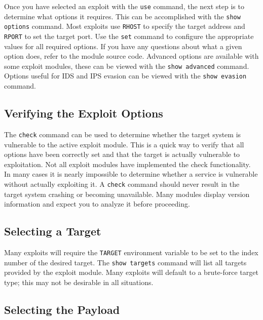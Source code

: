 \documentclass{report}
\begin{document}
\par 
Once you have selected an exploit with the \texttt{use} command, the next step
is to determine what options it requires. This can be accomplished with the
\texttt{show options} command. Most exploits use \texttt{RHOST} to specify the
target address and \texttt{RPORT} to set the target port. Use the \texttt{set}
command to configure the appropriate values for all required options. If you
have any questions about what a given option does, refer to the module source
code.  Advanced options are available with some exploit modules, these can be
viewed with the \texttt{show advanced} command. Options useful for IDS and IPS
evasion can be viewed with the \texttt{show evasion} command.

		\subsection{Verifying the Exploit Options}

\par	
The \texttt{check} command can be used to determine whether the target
system is vulnerable to the active exploit module. This is a quick way to
verify that all options have been correctly set and that the target is
actually vulnerable to exploitation. Not all exploit modules have implemented
the check functionality.  In many cases it is nearly impossible to determine
whether a service is vulnerable without actually exploiting it. A
\texttt{check} command should never result in the target system crashing or
becoming unavailable. Many modules display version information and
expect you to analyze it before proceeding.  

		\subsection{Selecting a Target}

\par Many exploits will require the \texttt{TARGET} environment variable to be
set to the index number of the desired target. The \texttt{show targets}
command will list all targets provided by the exploit module. Many exploits
will default to a brute-force target type; this may not be desirable in all
situations. 

		\subsection{Selecting the Payload}
\end{document}
